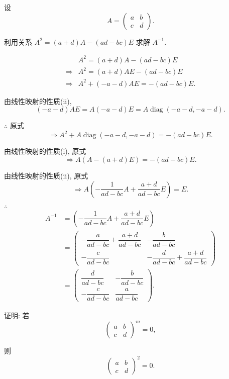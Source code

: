 \documentclass{ctexart}
\begin{document}
\setcounter{exercise}{13}
\begin{exercise}%
    设
    \[A=\begin{pmatrix}
        a & b \\
        c & d
    \end{pmatrix}.\]
    
    利用关系 $A^2=(a+d)A-(ad-bc)E$ 求解 $A^{-1}$.
\end{exercise}
\begin{solution}
    \begin{align*}
        & A^2=(a+d)A-(ad-bc)E \\
        \Rightarrow & A^2=(a+d)AE-(ad-bc)E \\
        \Rightarrow & A^2+(-a-d)AE=-(ad-bc)E.
    \end{align*}

    由线性映射的性质(ii),
    \[(-a-d)AE=A(-a-d)E=A\operatorname{diag}(-a-d,-a-d).\]

    $\therefore$ 原式
    \[\Rightarrow A^2+A\operatorname{diag}(-a-d,-a-d)=-(ad-bc)E.\]

    由线性映射的性质(i), 原式
    \[\Rightarrow A(A-(a+d)E)=-(ad-bc)E.\]

    由线性映射的性质(ii), 原式
    \[\Rightarrow A\left(-\dfrac{1}{ad-bc}A+\dfrac{a+d}{ad-bc}E\right)=E.\]

    $\therefore$
    \begin{align*}
        A^{-1} & =\left(-\dfrac{1}{ad-bc}A+\dfrac{a+d}{ad-bc}E\right) \\
        & =\begin{pmatrix}
            -\dfrac{a}{ad-bc}+\dfrac{a+d}{ad-bc} & -\dfrac{b}{ad-bc} \\[8pt]
            -\dfrac{c}{ad-bc} & -\dfrac{d}{ad-bc}+\dfrac{a+d}{ad-bc}
        \end{pmatrix} \\
        & =\begin{pmatrix}
            \dfrac{d}{ad-bc} & -\dfrac{b}{ad-bc} \\[8pt]
            -\dfrac{c}{ad-bc} & \dfrac{a}{ad-bc}
        \end{pmatrix}.
    \end{align*}
\end{solution}
\begin{exercise}%
    证明: 若
    \[\begin{pmatrix}
        a & b \\
        c & d
    \end{pmatrix}^m=0,\]

    则
    \[\begin{pmatrix}
        a & b \\
        c & d
    \end{pmatrix}^2=0.\]
\end{exercise}
\end{document}
